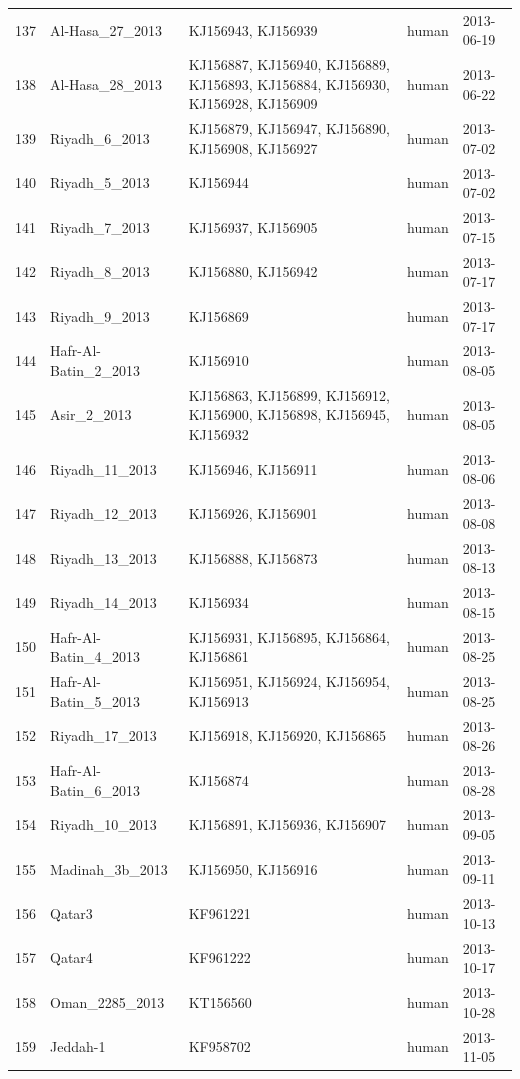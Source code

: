 \documentclass[9pt,lineno]{elife}
\begin{document}
\begin{longtable}{ | r | l | p{2cm} | l | l | }
  137 & Al-Hasa\_27\_2013 & KJ156943, KJ156939 & human & 2013-06-19 \\
  138 & Al-Hasa\_28\_2013 & KJ156887, KJ156940, KJ156889, KJ156893, KJ156884, KJ156930,
KJ156928, KJ156909 & human & 2013-06-22 \\
  139 & Riyadh\_6\_2013 & KJ156879, KJ156947, KJ156890, KJ156908, KJ156927 & human & 2013-07-02 \\
  140 & Riyadh\_5\_2013 & KJ156944 & human & 2013-07-02 \\
  141 & Riyadh\_7\_2013 & KJ156937, KJ156905 & human & 2013-07-15 \\
  142 & Riyadh\_8\_2013 & KJ156880, KJ156942 & human & 2013-07-17 \\
  143 & Riyadh\_9\_2013 & KJ156869 & human & 2013-07-17 \\
  144 & Hafr-Al-Batin\_2\_2013 & KJ156910 & human & 2013-08-05 \\
  145 & Asir\_2\_2013 & KJ156863, KJ156899, KJ156912, KJ156900, KJ156898, KJ156945,
KJ156932 & human & 2013-08-05 \\
  146 & Riyadh\_11\_2013 & KJ156946, KJ156911 & human & 2013-08-06 \\
  147 & Riyadh\_12\_2013 & KJ156926, KJ156901 & human & 2013-08-08 \\
  148 & Riyadh\_13\_2013 & KJ156888, KJ156873 & human & 2013-08-13 \\
  149 & Riyadh\_14\_2013 & KJ156934 & human & 2013-08-15 \\
  150 & Hafr-Al-Batin\_4\_2013 & KJ156931, KJ156895, KJ156864, KJ156861 & human & 2013-08-25 \\
  151 & Hafr-Al-Batin\_5\_2013 & KJ156951, KJ156924, KJ156954, KJ156913 & human & 2013-08-25 \\
  152 & Riyadh\_17\_2013 & KJ156918, KJ156920, KJ156865 & human & 2013-08-26 \\
  153 & Hafr-Al-Batin\_6\_2013 & KJ156874 & human & 2013-08-28 \\
  154 & Riyadh\_10\_2013 & KJ156891, KJ156936, KJ156907 & human & 2013-09-05 \\
  155 & Madinah\_3b\_2013 & KJ156950, KJ156916 & human & 2013-09-11 \\
  156 & Qatar3 & KF961221 & human & 2013-10-13 \\
  157 & Qatar4 & KF961222 & human & 2013-10-17 \\
  158 & Oman\_2285\_2013 & KT156560 & human & 2013-10-28 \\
  159 & Jeddah-1 & KF958702 & human & 2013-11-05 \\

\end{longtable}
\end{document}
